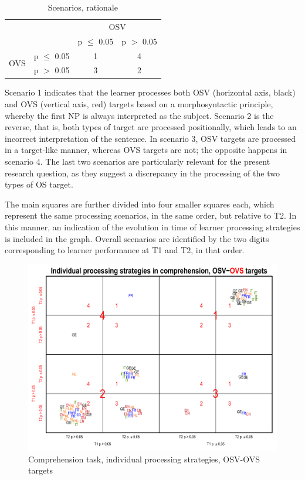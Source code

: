 \begin{table}
    \begin{tabular}{|lc|cc|}
    \hline
    & & \multicolumn{2}{c|}{OSV}\\
    &  & p ${\leq}$ 0.05 & p $>$ 0.05\\
    \hline
    \multirow{2}{*}{OVS} & p ${\leq}$ 0.05 & 1 & 4\\
                         & p $>$ 0.05 & 3 & 2\\
    \hline
    \end{tabular}
    \caption{Scenarios, rationale}
    \label{tab:05:6}
\end{table}

Scenario 1 indicates that the learner processes both OSV (horizontal axis, black) and OVS (vertical axis, red) targets based on a morphosyntactic principle, whereby the first NP is always interpreted as the subject. Scenario 2 is the reverse, that is, both types of target are processed positionally, which leads to an incorrect interpretation of the sentence. In scenario 3, OSV targets are processed in a target-like manner, whereas OVS targets are not; the opposite happens in scenario 4. The last two scenarios are particularly relevant for the present research question, as they suggest a discrepancy in the processing of the two types of OS target.

The main squares are further divided into four smaller squares each, which represent the same processing scenarios, in the same order, but relative to T2. In this manner, an indication of the evolution in time of learner processing strategies is included in the graph. Overall scenarios are identified by the two digits corresponding to learner performance at T1 and T2, in that order.

\begin{figure}
    \includegraphics[width=\textwidth]{figures/05-8.pdf}
    \caption{Comprehension task, individual processing strategies, OSV-OVS targets}
    \label{fig:05:8}
\end{figure}

